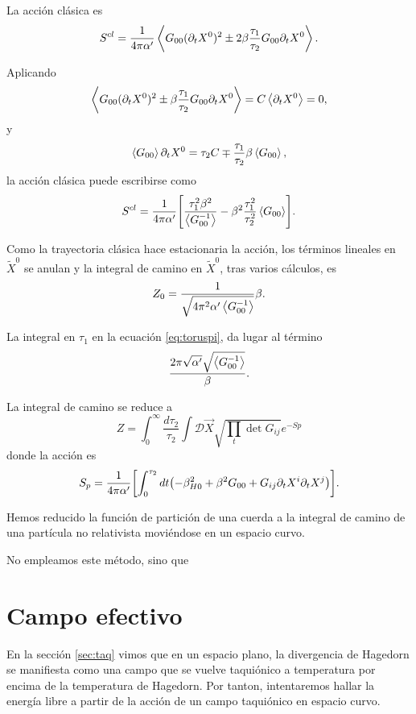 La acción clásica es
\begin{equation}
  S^{cl}=\frac{1}{4\pi\alpha'}\ev{G_{00}(\partial_t X^0)^2 \pm 2\beta \frac{\tau_1}{\tau_2}G_{00}\partial_t X^0}.
\end{equation}

Aplicando 
\begin{equation}
  \ev{G_{00}(\partial_t X^0)^2 \pm \beta \frac{\tau_1}{\tau_2}G_{00}\partial_t X^0} = C\ev{\partial_t X^0} = 0,
\end{equation}
y
\begin{equation}
  \ev{G_{00}}\partial_t X^0 = \tau_2 C\mp \frac{\tau_1}{\tau_2}\beta \ev{G_{00}},
\end{equation}
la acción clásica puede escribirse como
\begin{equation}
  S^{cl}= \frac{1}{4\pi\alpha'} \qty[\frac{\tau_1^2\beta^2}{\ev{G_{00}^{-1}}}-\beta^2\frac{\tau_1^2}{\tau_2^2}\ev{G_{00}}].
\end{equation}

Como la trayectoria clásica hace estacionaria la acción, los términos lineales en $\tilde X^0$
se anulan y la integral de camino en $\tilde X^0$, tras varios cálculos, es
\begin{equation}
  Z_0=\frac{1}{\sqrt{4\pi^2\alpha'\ev{G_{00}^{-1}}}}\beta.
\end{equation}

La integral en $\tau_1$ en la ecuación \ref{eq:toruspi}, da lugar al término 
\begin{equation}
  \frac{2\pi\sqrt{\alpha'}\sqrt{\ev{G_{00}^{-1}}}}{\beta}.
\end{equation}

La integral de camino se reduce a 
\begin{equation}
  Z=\int_0^\infty \frac{d\tau_2}{\tau_2}\int \mathcal D \vec {X} \sqrt{\prod_t \det G_{ij}}e^{-Sp}
  \label{eq:final}
\end{equation}
donde la acción es
\begin{equation}
  S_p=\frac{1}{4\pi\alpha'}\qty[\int_0^{\tau_2}dt \qty(-\beta^2_{H0}+\beta^2 G_{00}+G_{ij}\partial_t X^i\partial_t X^j)].
\end{equation}

Hemos reducido la función de partición de una cuerda a la integral de camino de
una partícula no relativista moviéndose en un espacio curvo.

No empleamos este método, sino que 

\section{Campo efectivo}
En la sección \ref{sec:taq} vimos que en un espacio plano, la divergencia de Hagedorn se manifiesta
como una campo que se vuelve taquiónico a temperatura por encima de la temperatura de
Hagedorn.
Por tanton, intentaremos hallar la energía libre a partir de la acción de un campo taquiónico
en espacio curvo.

